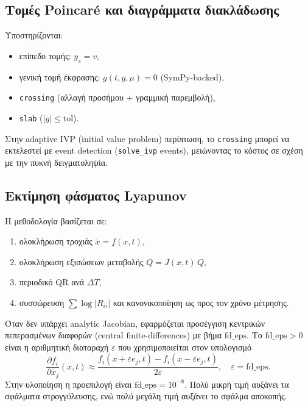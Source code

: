 \documentclass[11pt,a4paper]{report}
\begin{document}
\subsection{Τομές Poincar\'e και διαγράμματα διακλάδωσης}
\label{subsec:poincare-bifurcation-impl}

Υποστηρίζονται:
\begin{itemize}
\item επίπεδο τομής: $y_{s}=v$,
\item γενική τομή έκφρασης: $g(t,y,\mu)=0$ (SymPy-backed),
\item \texttt{crossing} (αλλαγή προσήμου + γραμμική παρεμβολή),
\item \texttt{slab} ($|g|\le \mathrm{tol}$).
\end{itemize}

Στην adaptive IVP (initial value problem) περίπτωση, το \texttt{crossing} μπορεί να εκτελεστεί με
event detection (\texttt{solve\_ivp} events), μειώνοντας το κόστος σε σχέση με
την πυκνή δειγματοληψία.

\subsection{Εκτίμηση φάσματος Lyapunov}
\label{subsec:lyapunov-estimation-impl}

\begin{importantbox}
Η μεθοδολογία βασίζεται σε:
\begin{enumerate}
\item ολοκλήρωση τροχιάς $\dot{x}=f(x,t)$,
\item ολοκλήρωση εξισώσεων μεταβολής
$\dot{Q}=J(x,t)\,Q$,
\item περιοδικό QR ανά $\Delta T$,
\item συσσώρευση $\sum\log|R_{ii}|$ και κανονικοποίηση ως προς τον χρόνο μέτρησης.
\end{enumerate}

Όταν δεν υπάρχει analytic Jacobian, εφαρμόζεται προσέγγιση κεντρικών πεπερασμένων
διαφορών (central finite-differences) με βήμα \(\mathrm{fd\_eps}\). Το
\(\mathrm{fd\_eps}>0\) είναι η αριθμητική διαταραχή \(\varepsilon\) που
χρησιμοποιείται στον υπολογισμό
\begin{equation}
\frac{\partial f_i}{\partial x_j}(x,t)\approx
\frac{f_i(x+\varepsilon e_j,t)-f_i(x-\varepsilon e_j,t)}{2\varepsilon},
\quad \varepsilon=\mathrm{fd\_eps}.
\end{equation}
Στην υλοποίηση η προεπιλογή είναι \(\mathrm{fd\_eps}=10^{-8}\). Πολύ μικρή τιμή
αυξάνει τα σφάλματα στρογγύλευσης, ενώ πολύ μεγάλη τιμή αυξάνει το σφάλμα αποκοπής.
\end{importantbox}
\end{document}

